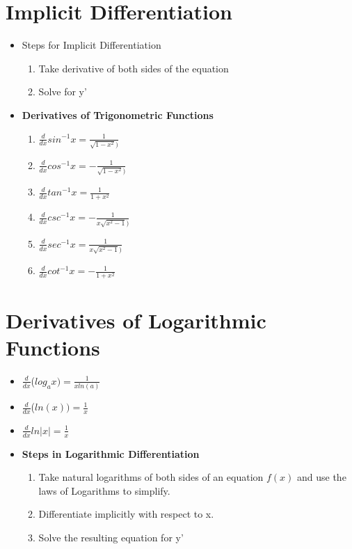 \documentclass{report}
\newcommand{\ddx}{$\frac{d}{dx}$}
\begin{document}
		\section{Implicit Differentiation}
			\begin{itemize}\addtolength{\leftskip}{2em}
				\item Steps for Implicit Differentiation
				\begin{enumerate}\addtolength{\leftskip}{4em}
				\item Take derivative of both sides of the equation 
				\item Solve for y'
				\end{enumerate}
				\item \textbf{Derivatives of Trigonometric Functions}
				\begin{enumerate}\addtolength{\leftskip}{4em}
				\item \ddx$sin^{-1}x=\frac{1}{\sqrt{1-x^2})}$
				\item \ddx$cos^{-1}x=-\frac{1}{\sqrt{1-x^2})}$
				\item \ddx$tan^{-1}x=\frac{1}{1+x^2}$
				\item \ddx$csc^{-1}x=-\frac{1}{x\sqrt{x^2-1})}$
				\item \ddx$sec^{-1}x=\frac{1}{x\sqrt{x^2-1})}$
				\item \ddx$cot^{-1}x=-\frac{1}{1+x^2}$
				\end{enumerate}
			\end{itemize}
		\section{Derivatives of Logarithmic Functions}
			\begin{itemize}\addtolength{\leftskip}{2em}
				\item \ddx($log_ax)=\frac{1}{xln(a)}$
				\item \ddx($ln(x))=\frac{1}{x}$
				\item \ddx$ln|x|=\frac{1}{x}$
				\item \textbf{Steps in Logarithmic Differentiation}
				\begin{enumerate}\addtolength{\leftskip}{4em}
				\item Take natural logarithms of both sides of an equation $f(x)$ and use the laws of Logarithms to simplify.
				\item Differentiate implicitly with respect to x.
				\item Solve the resulting equation for y'
				\end{enumerate}
			\end{itemize}
			\setcounter{section}{+8}
\end{document}
